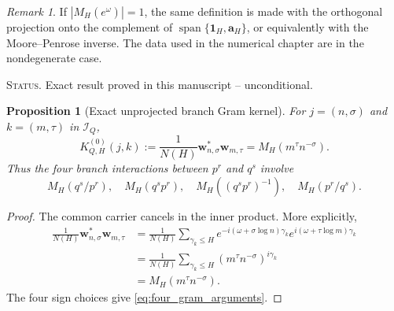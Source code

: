 \documentclass[11pt]{amsart}
\numberwithin{equation}{section}
\theoremstyle{plain}
\newtheorem{proposition}[theorem]{Proposition}
\theoremstyle{definition}
\theoremstyle{remark}
\newtheorem{remark}[theorem]{Remark}
\newcommand{\1}{\mathbf{1}}
\newcommand{\statusnote}[1]{%
  \par\smallskip\noindent
  \begingroup\footnotesize\textsc{Status.} #1\endgroup
  \par\smallskip}
\begin{document}
\begin{remark}
\label{rem:degenerate_joint_projection}
If $|M_H(e^\omega)|=1$, the same definition is made with the orthogonal
projection onto the complement of
$\operatorname{span}\{\mathbf 1_H,\mathbf a_H\}$, or equivalently with
the Moore--Penrose inverse.  The data used in the numerical chapter are in
the nondegenerate case.
\end{remark}

\statusnote{Exact result proved in this manuscript -- unconditional.}
\begin{proposition}[Exact unprojected branch Gram kernel]
\label{prop:unprojected_gram}
For $j=(n,\sigma)$ and $k=(m,\tau)$ in $\mathcal I_Q$,
\begin{equation}
K^{(0)}_{Q,H}(j,k)
:=
\frac1{N(H)}\mathbf w_{n,\sigma}^\ast\mathbf w_{m,\tau}
=
M_H(m^\tau n^{-\sigma}).
\label{eq:unprojected_gram}
\end{equation}
Thus the four branch interactions between $p^r$ and $q^s$ involve
\begin{equation}
M_H(q^s/p^r),
\quad
M_H(q^sp^r),
\quad
M_H((q^sp^r)^{-1}),
\quad
M_H(p^r/q^s).
\label{eq:four_gram_arguments}
\end{equation}
\end{proposition}

\begin{proof}
The common carrier cancels in the inner product.  More explicitly,
\begin{align}
\frac1{N(H)}\mathbf w_{n,\sigma}^\ast\mathbf w_{m,\tau}
&=
\frac1{N(H)}
\sum_{\gamma_k\leq H}
 e^{-i(\omega+\sigma\log n)\gamma_k}
 e^{ i(\omega+\tau\log m)\gamma_k}
\label{eq:branch_gram_expansion}
\\
&=
\frac1{N(H)}
\sum_{\gamma_k\leq H}
(m^\tau n^{-\sigma})^{i\gamma_k}
\label{eq:branch_gram_kernel_step}
\\
&=
M_H(m^\tau n^{-\sigma}).
\label{eq:branch_gram_kernel_result}
\end{align}
The four sign choices give \eqref{eq:four_gram_arguments}.
\end{proof}
\end{document}

